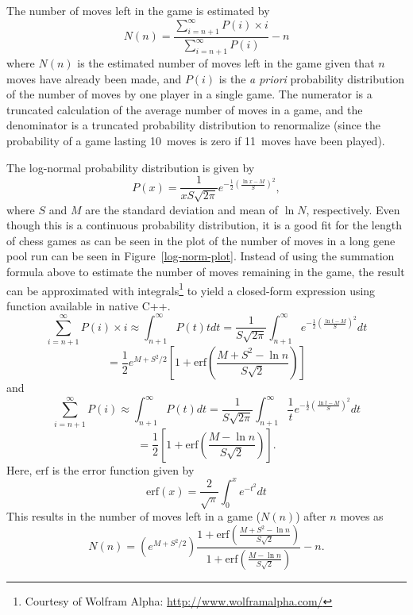 \documentclass[letterpaper]{article}
\newcommand{\cpp}{C{\nobreak +}{\nobreak +}}
\renewcommand{\_}{\allowbreak\textunderscore\allowbreak}
\begin{document}
The number of moves left in the game is estimated by
\[N(n) = \frac{\sum_{i = n + 1}^\infty P(i)\times{}i}{\sum_{i = n + 1}^\infty P(i)} - n\]
where \(N(n)\) is the estimated number of moves left in the game given that \(n\) moves have already been made, and \(P(i)\) is the \emph{a priori} probability distribution of the number of moves by one player in a single game. The numerator is a truncated calculation of the average number of moves in a game, and the denominator is a truncated probability distribution to renormalize (since the probability of a game lasting 10~moves is zero if 11~moves have been played).

The log-normal probability distribution is given by
\[P(x) = \frac{1}{xS\sqrt{2\pi}} e^{-\frac{1}{2}\left(\frac{\ln{x} - M}{S}\right)^2},\]
where \(S\) and \(M\) are the standard deviation and mean of \(\ln{N}\), respectively. Even though this is a continuous probability distribution, it is a good fit for the length of chess games as can be seen in the plot of the number of moves in a long gene pool run can be seen in Figure~\ref{log-norm-plot}. Instead of using the summation formula above to estimate the number of moves remaining in the game, the result can be approximated with integrals\footnote{Courtesy of Wolfram Alpha: \url{http://www.wolframalpha.com/}} to yield a closed-form expression using function available in native \cpp.
\[
\sum_{i = n + 1}^\infty P(i)\times{}i \approx \int_{n+1}^\infty P(t)tdt = \frac{1}{S\sqrt{2\pi}} \int_{n+1}^\infty e^{-\frac{1}{2}\left(\frac{\ln{t} - M}{S}\right)^2}dt
\]
\[
= \frac{1}{2}e^{M + S^2/2}\left[1 + \textrm{erf}\left(\frac{M + S^2 - \ln n}{S\sqrt{2}}\right)\right]
\]
and
\[
\sum_{i = n + 1}^\infty P(i) \approx \int_{n+1}^\infty P(t)dt = \frac{1}{S\sqrt{2\pi}} \int_{n+1}^\infty \frac{1}{t} e^{-\frac{1}{2}\left(\frac{\ln{t} - M}{S}\right)^2}dt
\]
\[
= \frac{1}{2}\left[1 + \textrm{erf}\left(\frac{M-\ln n}{S\sqrt{2}}\right)\right].
\]
Here, \(\textrm{erf}\) is the error function given by
\[
\textrm{erf}(x) = \frac{2}{\sqrt{\pi}}\int_0^x e^{-t^2}dt
\]
This results in the number of moves left in a game (\(N(n)\)) after \(n\) moves as
\[
N(n) = \left(e^{M + S^2/2}\right) \frac
{1 + \textrm{erf}\left(\frac{M + S^2 - \ln n}{S\sqrt{2}}\right)}
{1 + \textrm{erf}\left(\frac{M-\ln n}{S\sqrt{2}}\right)}
- n.
\]
\end{document}
